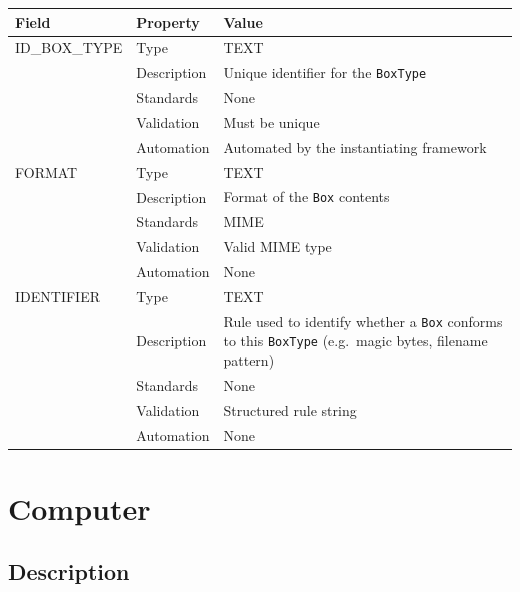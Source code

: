 \documentclass[
]{article}
\newcounter{none}
\begin{document}
{\def\LTcaptype{none} 
\begin{longtable}[]{@{}
  >{\raggedright\arraybackslash}p{}
  >{\raggedright\arraybackslash}p{}
  >{\raggedright\arraybackslash}p{}@{}}
\toprule\noalign{}
\begin{minipage}[b]{\linewidth}\raggedright
Field
\end{minipage} & \begin{minipage}[b]{\linewidth}\raggedright
Property
\end{minipage} & \begin{minipage}[b]{\linewidth}\raggedright
Value
\end{minipage} \\
\midrule\noalign{}
\endhead
\bottomrule\noalign{}
\endlastfoot
ID\_BOX\_TYPE & Type & TEXT \\
& Description & Unique identifier for the \texttt{BoxType} \\
& Standards & None \\
& Validation & Must be unique \\
& Automation & Automated by the instantiating framework \\
FORMAT & Type & TEXT \\
& Description & Format of the \texttt{Box} contents \\
& Standards & MIME \\
& Validation & Valid MIME type \\
& Automation & None \\
IDENTIFIER & Type & TEXT \\
& Description & Rule used to identify whether a \texttt{Box} conforms to
this \texttt{BoxType} (e.g.~magic bytes, filename pattern) \\
& Standards & None \\
& Validation & Structured rule string \\
& Automation & None \\
\end{longtable}
}

\section{Computer}\label{computer}

\subsection{Description}\label{description-6}
\end{document}
